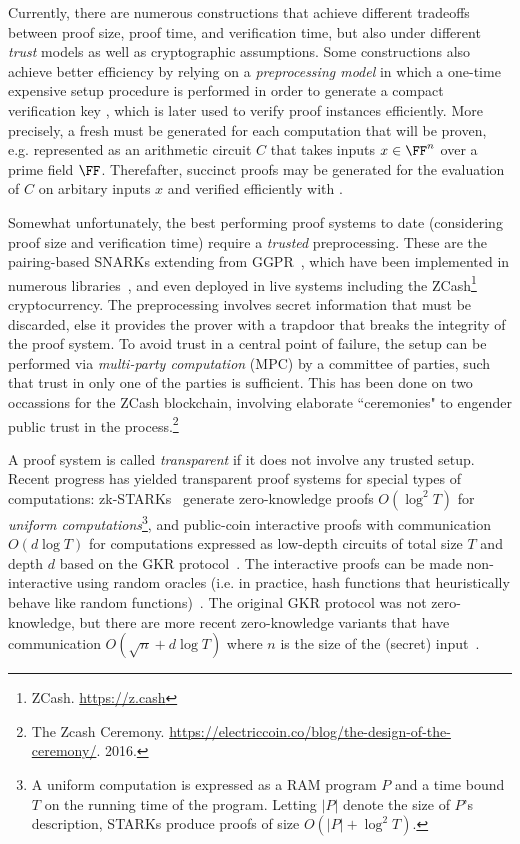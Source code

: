 Currently, there are numerous constructions that achieve different tradeoffs between proof size, proof time, and verification time, but also under different \emph{trust} models as well as cryptographic assumptions. %
Some constructions also achieve better efficiency by relying on a \emph{preprocessing model} in which a one-time expensive setup procedure is performed in order to generate a compact verification key , which is later used to verify proof instances efficiently. More precisely, a fresh  must be generated for each computation that will be proven, e.g. represented as an arithmetic circuit $C$ that takes inputs $x \in \FF^n$ over a prime field $\FF$. Therefafter, succinct proofs may be generated for the evaluation of $C$ on arbitary inputs $x$ and verified efficiently with . 

Somewhat unfortunately, the best performing proof systems to date (considering proof size and verification time) require a \emph{trusted} preprocessing. These are the pairing-based SNARKs extending from GGPR~\cite{EC:GGPR13, ES:SBVBPW13, SP:PHGR13, TCC:BCIOP13, C:BCGTV13, USENIX:BCTV14, EC:Groth16}, which have been implemented in numerous libraries~\cite{C:BCGTV13,bellman}, and even deployed in live systems including the ZCash\footnote{ZCash. \url{https://z.cash}} cryptocurrency. The preprocessing involves secret information that must be discarded, else it provides the prover with a trapdoor that breaks the integrity of the proof system. To avoid trust in a central point of failure, the setup can be performed via \emph{multi-party computation} (MPC) by a committee of parties, such that trust in only one of the parties is sufficient. This has been done on two occassions for the ZCash blockchain, involving elaborate ``ceremonies" to engender public trust in the process.\footnote{The Zcash Ceremony. \url{https://electriccoin.co/blog/the-design-of-the-ceremony/}. 2016.}

A proof system is called \emph{transparent} if it does not involve any trusted setup. Recent progress has yielded transparent proof systems for special types of computations: zk-STARKs~\cite{ICALP:BBHR18} generate zero-knowledge proofs $O(\log^2 T)$ for \emph{uniform computations}\footnote{A uniform computation is expressed as a RAM program $P$ and a time bound $T$ on the running time of the program. Letting $|P|$ denote the size of $P$'s description, STARKs produce proofs of size $O(|P| + \log^2 T)$.}, and public-coin interactive proofs with communication $O(d \log T)$ for computations expressed as low-depth circuits of total size $T$ and depth $d$ based on the GKR protocol~\cite{STOC:GolKalRot08}. The interactive proofs can be made non-interactive using random oracles (i.e. in practice, hash functions that heuristically behave like random functions)~\cite{C:FiaSha86, STOC:CCHLRRW19}. The original GKR protocol was not zero-knowledge, but there are more recent zero-knowledge variants that have communication $O( \sqrt{n} + d \log T)$ where $n$ is the size of the (secret) input~\cite{SP:WTSTW18, EPRINT:ZGKPP17b}. 

